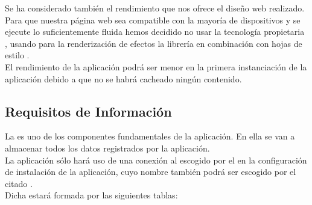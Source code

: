 Se ha considerado también el rendimiento que nos ofrece el diseño web
realizado. Para que nuestra página web sea compatible con la mayoría de
dispositivos y se ejecute lo suficientemente fluida hemos decidido no usar la
tecnología propietaria , usando para la renderización de efectos
la librería  en combinación
con hojas de estilo .\\

El rendimiento de la aplicación podrá ser menor en la primera instanciación de
la aplicación debido a que no se habrá cacheado ningún contenido.

\subsection{Requisitos de Información}
La  es uno de los componentes fundamentales de la
aplicación. En ella se van a almacenar todos los datos registrados
por la aplicación.\\

La aplicación sólo hará uso de una conexión al  escogido por el
 en la configuración de instalación de la aplicación, cuyo
nombre también podrá ser escogido por el citado
.\\

Dicha  estará formada por las siguientes tablas:

